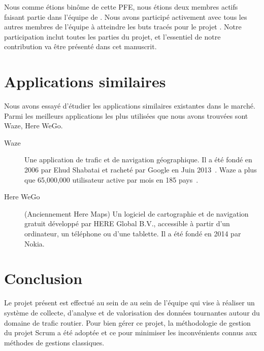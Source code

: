 Nous comme étions binôme de cette PFE, nous étions deux membres actifs faisant
partie dans l'équipe de . Nous avons participé
activement avec tous les autres membres de l'équipe à atteindre les buts tracés
pour le projet . Notre participation inclut toutes les
parties du projet, et l'essentiel de notre contribution va être présenté dans
cet manuscrit.


\section{Applications similaires}

Nous avons essayé d'étudier les applications similaires existantes dans le
marché. Parmi les meilleurs applications les plus utilisées que nous avons
trouvées sont Waze, Here WeGo.

\begin{description}
    \item [Waze] Une application de trafic et de navigation géographique. Il a
        été fondé en 2006 par Ehud Shabatai et racheté par Google en Juin
        2013~\cite{waze-google}. Waze a plus que 65,000,000 utilisateur active
        par mois en 185 pays~\cite{waze-driverindex}.
    \item [Here WeGo] (Anciennement Here Maps) Un logiciel de cartographie et
        de navigation gratuit développé par HERE Global B.V., accessible à
        partir d’un ordinateur, un téléphone ou d’une tablette. Il a été fondé
        en 2014 par Nokia.
\end{description}

\section*{Conclusion}

Le projet présent est effectué au sein de  au sein
de l'équipe  qui vise à réaliser un système de collecte,
d'analyse et de valorisation des données tournantes autour du domaine de trafic
routier. Pour bien gérer ce projet, la méthodologie de gestion du projet Scrum
a été adoptée et ce pour minimiser les inconvénients connus aux méthodes de
gestions classiques.
